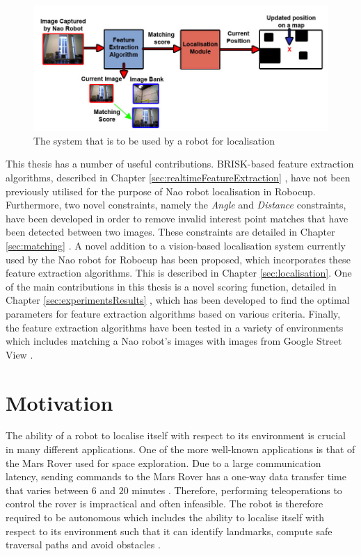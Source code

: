 \begin{figure}[h!] 
  \centering
    \includegraphics[width=1.0\textwidth]{../Drawings/introduction/Full_system.jpg}
    \caption{The system that is to be used by a robot for localisation}
    \label{fig:system}
\end{figure}

This thesis has a number of useful contributions. BRISK-based feature extraction algorithms, described in Chapter \ref{sec:realtimeFeatureExtraction} , have not been previously utilised for the purpose of Nao robot localisation in Robocup. Furthermore, two novel constraints, namely the \textit{Angle} and \textit{Distance} constraints, have been developed in order to remove invalid interest point matches that have been detected between two images. These constraints are detailed in Chapter \ref{sec:matching} . A novel addition to a vision-based localisation system currently used by the Nao robot for Robocup has been proposed, which incorporates these feature extraction algorithms. This is described in Chapter \ref{sec:localisation}. One of the main contributions in this thesis is a novel scoring function, detailed in Chapter \ref{sec:experimentsResults} , which has been developed to find the optimal parameters for feature extraction algorithms based on various criteria. Finally, the feature extraction algorithms have been tested in a variety of environments which includes matching a Nao robot's images with images from Google Street View \cite{StreetView}.\\

\section{Motivation}
\label{sec:motivation}
The ability of a robot to localise itself with respect to its environment is crucial in many different applications. One of the more well-known applications is that of the Mars Rover used for space exploration. Due to a large communication latency, sending commands to the Mars Rover has a one-way data transfer time that varies between $6$ and $20$ minutes \citep{Powell2006}. Therefore, performing teleoperations to control the rover is impractical and often infeasible. The robot is therefore required to be autonomous which includes the ability to localise itself with respect to its environment such that it can identify landmarks, compute safe traversal paths and avoid obstacles \citep{Powell2006}.\\


